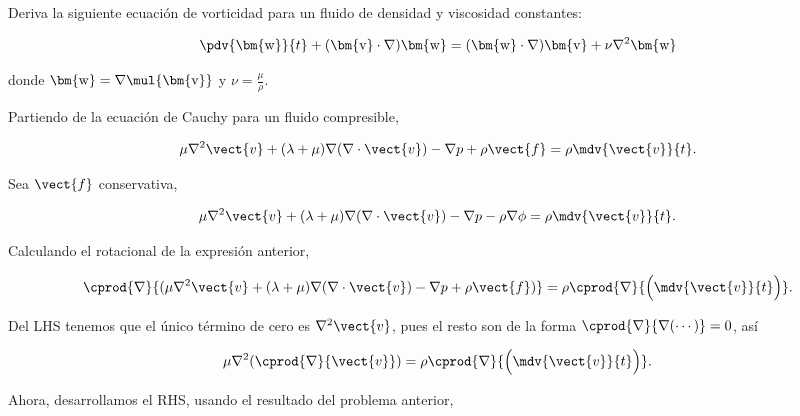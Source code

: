\documentclass[../main.tex]{subfiles}
\begin{document}
\begin{problema}
	Deriva la siguiente ecuación de vorticidad para un fluido de densidad
	y viscosidad constantes:

	\begin{equation*}
		\pdv{\bm{\mathrm{w}}}{t} + (\bm{\mathrm{v}}\cdot \nabla)\bm{\mathrm{w}} =
		(\bm{\mathrm{w}} \cdot \nabla)\bm{\mathrm{v}} + \nu \nabla^{2}{\bm{\mathrm{w}}}
	\end{equation*}

	donde \(\bm{\mathrm{w}} = \nabla \mul{\bm{\mathrm{v}}}\) y \(\nu = \tfrac{\mu}{\rho}\).

	\startsolution

	Partiendo de la ecuación de Cauchy para un fluido compresible,

	\begin{equation*}
		\mu \nabla^{2}{\vect{v}} + (\lambda + \mu)\nabla{(\nabla \cdot{\vect{v}})} -
		\nabla{p} + \rho \vect{f} = \rho \mdv{\vect{v}}{t}.
	\end{equation*}

	Sea \(\vect{f}\) conservativa,

	\begin{equation*}
		\mu \nabla^{2}{\vect{v}} + (\lambda + \mu)\nabla{(\nabla \cdot{\vect{v}})} -
		\nabla{p} - \rho \nabla{\phi} = \rho \mdv{\vect{v}}{t}.
	\end{equation*}

	Calculando el rotacional de la expresión anterior,

	\begin{equation*}
		\cprod{\nabla}{( \mu \nabla^{2}{\vect{v}} + (\lambda + \mu)\nabla{(\nabla \cdot{\vect{v}})} -
			\nabla{p} + \rho \vect{f} )} = \rho \cprod{\nabla}{\Bigl(\mdv{\vect{v}}{t}\Bigr)}.
	\end{equation*}

	Del LHS tenemos que el único término de cero es \(\nabla^{2}{\vect{v}}\),
	pues el resto son de la forma \(\cprod{\nabla}{\nabla{(\cdots)}} = 0\), así

	\begin{equation}
		\mu \nabla^{2}{(\cprod{\nabla}{\vect{v}})} = \rho\cprod{\nabla}{\Bigl(\mdv{\vect{v}}{t}\Bigr)}.
		\label{eq:cauchy-lhs-developed}
	\end{equation}

	Ahora, desarrollamos el RHS, usando el resultado del problema anterior,


\end{problema}
\end{document}
